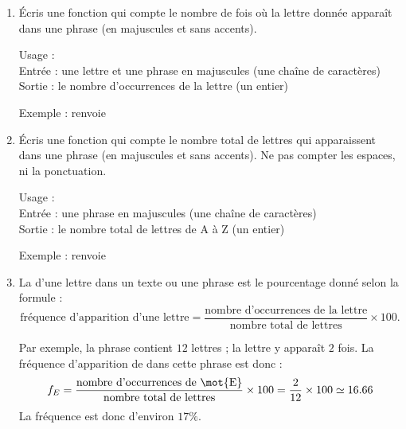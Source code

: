 \documentclass[11pt,class=report,crop=false]{standalone}
\begin{document}
\begin{activite}


\begin{enumerate}
  \item  Écris une fonction  qui compte le nombre de fois où la lettre donnée apparaît dans une phrase (en majuscules et sans accents).
  
    \begin{fonction}
  Usage : \\
   Entrée : une lettre et une phrase en majuscules (une chaîne de caractères)\\
   Sortie : le nombre d'occurrences de la lettre (un entier)
  
  \medskip
     
   Exemple :  renvoie 
  \end{fonction}
  
 \item Écris une fonction  qui compte le nombre total de lettres qui apparaissent dans une phrase (en majuscules et sans accents). Ne pas compter les espaces, ni la ponctuation.
 
     \begin{fonction}
   Usage : \\
   Entrée : une phrase en majuscules (une chaîne de caractères)\\
   Sortie : le nombre total de lettres de \og{}A\fg{} à \og{}Z\fg{} (un entier)
  
  \medskip
     
   Exemple :  renvoie 
  \end{fonction}
 
 \item La  d'une lettre dans un texte ou une phrase est le pourcentage donné selon la formule :
 $$\text{fréquence d'apparition d'une lettre} = \frac{\text{nombre d'occurrences de la lettre}}{\text{nombre total de lettres}} \times 100.$$
 
 \medskip
 
 Par exemple, la phrase  contient $12$ lettres ; 
  la lettre  y apparaît $2$ fois. La fréquence d'apparition de  dans cette phrase est donc :
  $$f_E =  \frac{\text{nombre d'occurrences de \mot{E}}}{\text{nombre total de lettres}} \times 100 = \frac{2}{12} \times  100 \simeq 16.66$$
 La fréquence est donc d'environ $17\%$.
  

\end{enumerate}
\end{activite}
\end{document}
